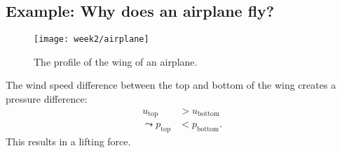 \subsection{Example: Why does an airplane fly?}
\begin{figure}[!h]
    \centering
    \texttt{[image: week2/airplane]}
    \caption{The profile of the wing of an airplane.}
    \label{fig:airplane}
\end{figure}
The wind speed difference between the top and bottom of the wing creates a pressure difference:
\begin{align}
u_\mathrm{top} &> u_\mathrm{bottom}\\
\leadsto
p_\mathrm{top} &< p_\mathrm{bottom}.
\end{align}
This results in a lifting force.